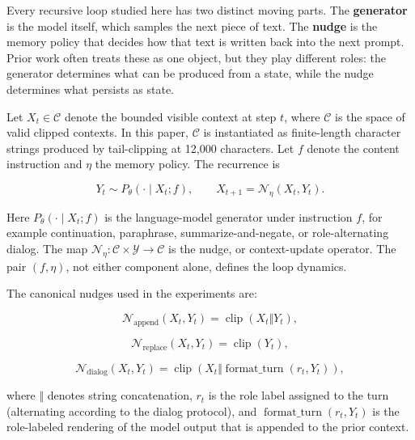 \documentclass{article}
\theoremstyle{plain}
\theoremstyle{definition}
\begin{document}
Every recursive loop studied here has two distinct moving parts. The \textbf{generator} is the model itself, which samples the next piece of text. The \textbf{nudge} is the memory policy that decides how that text is written back into the next prompt. Prior work often treats these as one object, but they play different roles: the generator determines what can be produced from a state, while the nudge determines what persists as state.

Let \(X_t \in \mathcal{C}\) denote the bounded visible context at step \(t\), where \(\mathcal{C}\) is the space of valid clipped contexts. In this paper, \(\mathcal{C}\) is instantiated as finite-length character strings produced by tail-clipping at 12,000 characters. Let \(f\) denote the content instruction and \(\eta\) the memory policy. The recurrence is

\[Y_t \sim P_\theta(\cdot \mid X_t; f),
\qquad
X_{t+1} = \mathcal{N}_\eta(X_t, Y_t).\]

Here \(P_\theta(\cdot \mid X_t; f)\) is the language-model generator under instruction \(f\), for example continuation, paraphrase, summarize-and-negate, or role-alternating dialog. The map \(\mathcal{N}_\eta : \mathcal{C} \times \mathcal{Y} \to \mathcal{C}\) is the nudge, or context-update operator. The pair \((f,\eta)\), not either component alone, defines the loop dynamics.

The canonical nudges used in the experiments are:

\[\mathcal{N}_{\mathrm{append}}(X_t,Y_t)
=
\operatorname{clip}(X_t \Vert Y_t),\]

\[\mathcal{N}_{\mathrm{replace}}(X_t,Y_t)
=
\operatorname{clip}(Y_t),\]

\[\mathcal{N}_{\mathrm{dialog}}(X_t,Y_t)
=
\operatorname{clip}\!\left(X_t \Vert \operatorname{format\_turn}(r_t,Y_t)\right),\]

where \(\Vert\) denotes string concatenation, \(r_t\) is the role label assigned to the turn (alternating according to the dialog protocol), and \(\operatorname{format\_turn}(r_t,Y_t)\) is the role-labeled rendering of the model output that is appended to the prior context.
\end{document}
